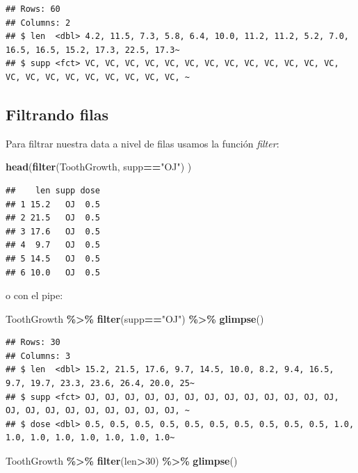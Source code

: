 \documentclass[
]{book}
\newenvironment{Shaded}{\begin{snugshade}}{\end{snugshade}}
\newcommand{\DecValTok}[1]{\textcolor[rgb]{0.00,0.00,0.81}{#1}}
\newcommand{\FunctionTok}[1]{\textcolor[rgb]{0.13,0.29,0.53}{\textbf{#1}}}
\newcommand{\NormalTok}[1]{#1}
\newcommand{\SpecialCharTok}[1]{\textcolor[rgb]{0.81,0.36,0.00}{\textbf{#1}}}
\newcommand{\StringTok}[1]{\textcolor[rgb]{0.31,0.60,0.02}{#1}}
\begin{document}
\begin{verbatim}
## Rows: 60
## Columns: 2
## $ len  <dbl> 4.2, 11.5, 7.3, 5.8, 6.4, 10.0, 11.2, 11.2, 5.2, 7.0, 16.5, 16.5, 15.2, 17.3, 22.5, 17.3~
## $ supp <fct> VC, VC, VC, VC, VC, VC, VC, VC, VC, VC, VC, VC, VC, VC, VC, VC, VC, VC, VC, VC, VC, VC, ~
\end{verbatim}

\subsection{Filtrando filas}\label{filtrando-filas-1}

Para filtrar nuestra data a nivel de filas usamos la función \emph{filter}:

\begin{Shaded}
\begin{Highlighting}[]
\FunctionTok{head}\NormalTok{(}\FunctionTok{filter}\NormalTok{(ToothGrowth, supp}\SpecialCharTok{==}\StringTok{"OJ"}\NormalTok{) )}
\end{Highlighting}
\end{Shaded}

\begin{verbatim}
##    len supp dose
## 1 15.2   OJ  0.5
## 2 21.5   OJ  0.5
## 3 17.6   OJ  0.5
## 4  9.7   OJ  0.5
## 5 14.5   OJ  0.5
## 6 10.0   OJ  0.5
\end{verbatim}

o con el pipe:

\begin{Shaded}
\begin{Highlighting}[]
\NormalTok{ToothGrowth }\SpecialCharTok{\%\textgreater{}\%} \FunctionTok{filter}\NormalTok{(supp}\SpecialCharTok{==}\StringTok{"OJ"}\NormalTok{) }\SpecialCharTok{\%\textgreater{}\%} \FunctionTok{glimpse}\NormalTok{()}
\end{Highlighting}
\end{Shaded}

\begin{verbatim}
## Rows: 30
## Columns: 3
## $ len  <dbl> 15.2, 21.5, 17.6, 9.7, 14.5, 10.0, 8.2, 9.4, 16.5, 9.7, 19.7, 23.3, 23.6, 26.4, 20.0, 25~
## $ supp <fct> OJ, OJ, OJ, OJ, OJ, OJ, OJ, OJ, OJ, OJ, OJ, OJ, OJ, OJ, OJ, OJ, OJ, OJ, OJ, OJ, OJ, OJ, ~
## $ dose <dbl> 0.5, 0.5, 0.5, 0.5, 0.5, 0.5, 0.5, 0.5, 0.5, 0.5, 1.0, 1.0, 1.0, 1.0, 1.0, 1.0, 1.0, 1.0~
\end{verbatim}

\begin{Shaded}
\begin{Highlighting}[]
\NormalTok{ToothGrowth }\SpecialCharTok{\%\textgreater{}\%} \FunctionTok{filter}\NormalTok{(len}\SpecialCharTok{\textgreater{}}\DecValTok{30}\NormalTok{) }\SpecialCharTok{\%\textgreater{}\%} \FunctionTok{glimpse}\NormalTok{()}
\end{Highlighting}
\end{Shaded}
\end{document}
